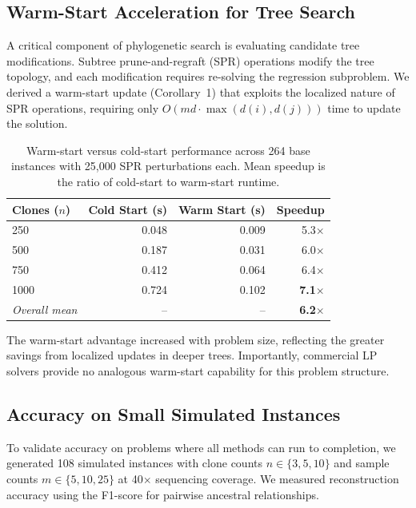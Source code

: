 \documentclass[11pt]{article}
\begin{document}
\subsection{Warm-Start Acceleration for Tree Search}

A critical component of phylogenetic search is evaluating candidate tree modifications. Subtree prune-and-regraft (SPR) operations modify the tree topology, and each modification requires re-solving the regression subproblem. We derived a warm-start update (Corollary~1) that exploits the localized nature of SPR operations, requiring only $O(md \cdot \max(d(i), d(j)))$ time to update the solution.

\begin{table}[H]
\centering
\caption{Warm-start versus cold-start performance across 264 base instances with 25,000 SPR perturbations each. Mean speedup is the ratio of cold-start to warm-start runtime.}
\label{tab:warmstart}
\begin{tabular}{lrrr}
\toprule
\textbf{Clones ($n$)} & \textbf{Cold Start (s)} & \textbf{Warm Start (s)} & \textbf{Speedup} \\
\midrule
250 & 0.048 & 0.009 & 5.3$\times$ \\
500 & 0.187 & 0.031 & 6.0$\times$ \\
750 & 0.412 & 0.064 & 6.4$\times$ \\
1000 & 0.724 & 0.102 & \textbf{7.1$\times$} \\
\midrule
\textit{Overall mean} & -- & -- & \textbf{6.2$\times$} \\
\bottomrule
\end{tabular}
\end{table}

The warm-start advantage increased with problem size, reflecting the greater savings from localized updates in deeper trees. Importantly, commercial LP solvers provide no analogous warm-start capability for this problem structure.

\subsection{Accuracy on Small Simulated Instances}

To validate accuracy on problems where all methods can run to completion, we generated 108 simulated instances with clone counts $n \in \{3, 5, 10\}$ and sample counts $m \in \{5, 10, 25\}$ at 40$\times$ sequencing coverage. We measured reconstruction accuracy using the F1-score for pairwise ancestral relationships.
\end{document}

